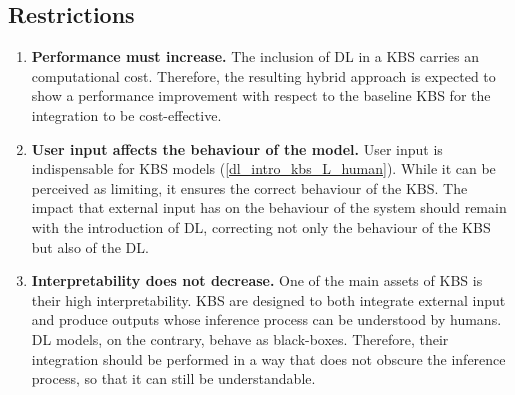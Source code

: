 \subsection*{Restrictions}
\begin{enumerate} [start=1,label={\bfseries R\arabic*.}]
    \item \textbf{Performance must increase.} \label{dlinstrokbs_R_performance} The inclusion of DL in a KBS carries an computational cost. Therefore, the resulting hybrid approach is expected to show a performance improvement with respect to the baseline KBS for the integration to be cost-effective. 
    
    \item \textbf{User input affects the behaviour of the model.}\label{dlintrokbs_R_user} User input is indispensable for KBS models (\ref{dl_intro_kbs_L_human}). While it can be perceived as limiting, it ensures the correct behaviour of the KBS. The impact that external input has on the behaviour of the system should remain with the introduction of DL, correcting not only the behaviour of the KBS but also of the DL.
    
    \item \textbf{Interpretability does not decrease.}\label{dlintrokbs_LR_interpretability} One of the main assets of KBS is their high interpretability. KBS are designed to both integrate external input and produce outputs whose inference process can be understood by humans. DL models, on the contrary, behave as black-boxes. Therefore, their integration should be performed in a way that does not obscure the inference process, so that it can still be understandable.
    
\end{enumerate}
